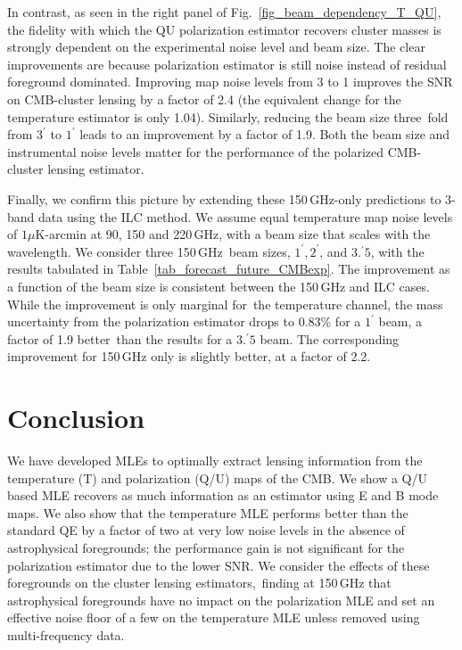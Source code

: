 In contrast, as seen in the right panel of Fig.~\ref{fig_beam_dependency_T_QU}, the fidelity with which the QU polarization estimator recovers cluster masses is strongly dependent on the experimental noise level and beam size. The clear improvements are because polarization estimator is still noise instead of residual foreground dominated. Improving map noise levels from 3 to 1 \ukarcmin{} improves the SNR on CMB-cluster lensing by a factor of 2.4 (the equivalent change for the temperature estimator is only 1.04). Similarly, reducing the beam size three\
fold from $3^\prime$ to $1^\prime$ leads to an improvement by a factor of 1.9. Both the beam size and instrumental noise levels matter for the performance of the polarized CMB-cluster lensing estimator.

Finally, we confirm this picture by extending these 150\,GHz-only predictions to 3-band data using the ILC method. We assume equal temperature map noise levels of $1 \mu$K-arcmin at 90, 150 and 220\,GHz, with a beam size that scales with the wavelength. We consider three 150\,GHz\
 beam sizes, $1^\prime, 2^\prime$, and $3.^\prime 5$, with the results  tabulated in Table~\ref{tab_forecast_future_CMBexp}.
The improvement  as a function of the beam size is consistent between the 150\,GHz and ILC cases. While the improvement is only marginal for\
 the temperature channel, the mass uncertainty from the polarization estimator drops to 0.83\% for a $1^\prime$ beam, a factor of 1.9 better\
 than the results for a $3.^\prime5$ beam. The corresponding improvement for 150\,GHz only is slightly better, at a factor of 2.2.
 
 \section{Conclusion}
\label{sec_conclusion}
We have developed MLEs to optimally extract lensing information from the temperature (T) and polarization (Q/U) maps of the CMB. We show a Q/U based MLE recovers as much information as an estimator using E and B mode maps. We also show that the temperature MLE performs better than the standard QE by a factor of two at very low noise levels in the absence of astrophysical foregrounds; the performance gain is not significant for the polarization estimator due to the lower SNR. We consider the effects of these foregrounds on the cluster lensing estimators,\
 finding at 150\,GHz that  astrophysical foregrounds have no impact on the polarization MLE and set an effective noise floor of a few \ukarcmin{} on the temperature MLE unless removed using multi-frequency data.

